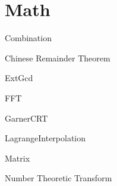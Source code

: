 \section{Math}

Combination


Chinese Remainder Theorem


ExtGcd


FFT


GarnerCRT


LagrangeInterpolation


Matrix


Number Theoretic Transform

